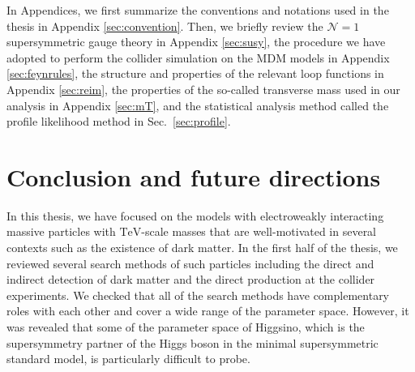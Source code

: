 \documentclass[12pt,twoside,book]{article}
\begin{document}
In Appendices, we first summarize the conventions and notations used in the thesis in Appendix \ref{sec:convention}.
Then, we briefly review the $\mathcal{N}=1$ supersymmetric gauge theory in Appendix \ref{sec:susy}, the procedure we have adopted to perform the collider simulation on the MDM models in Appendix \ref{sec:feynrules}, the structure and properties of the relevant loop functions in Appendix \ref{sec:reim}, the properties of the so-called transverse mass used in our analysis in Appendix \ref{sec:mT}, and the statistical analysis method called the profile likelihood method in Sec.~\ref{sec:profile}.

\clearpage



\clearpage



\clearpage



\clearpage



\clearpage


\section[Conclusion and future directions]{Conclusion and future directions}
\setcounter{equation}{0}
\label{sec:conclusion}

\vskip 0.1in

In this thesis, we have focused on the models with electroweakly interacting massive particles with $\mathrm{TeV}$-scale masses that are well-motivated in several contexts such as the existence of dark matter.
In the first half of the thesis, we reviewed several search methods of such particles including the direct and indirect detection of dark matter and the direct production at the collider experiments.
We checked that all of the search methods have complementary roles with each other and cover a wide range of the parameter space.
However, it was revealed that some of the parameter space of Higgsino, which is the supersymmetry partner of the Higgs boson in the minimal supersymmetric standard model, is particularly difficult to probe.
\end{document}
